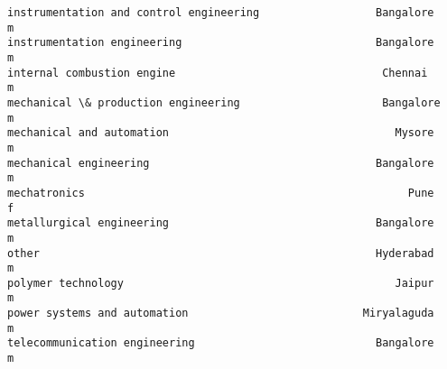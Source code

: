 \documentclass[11pt]{article}
\begin{document}
\begin{tcolorbox}[breakable, size=fbox, boxrule=.5pt, pad at break*=1mm, opacityfill=0]
\begin{Verbatim}[commandchars=\\\{\}]
instrumentation and control engineering                  Bangalore      m
instrumentation engineering                              Bangalore      m
internal combustion engine                                Chennai       m
mechanical \& production engineering                      Bangalore      m
mechanical and automation                                   Mysore      m
mechanical engineering                                   Bangalore      m
mechatronics                                                  Pune      f
metallurgical engineering                                Bangalore      m
other                                                    Hyderabad      m
polymer technology                                          Jaipur      m
power systems and automation                           Miryalaguda      m
telecommunication engineering                            Bangalore      m


\end{Verbatim}
\end{tcolorbox}
\end{document}
